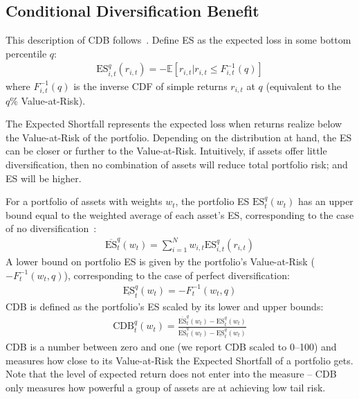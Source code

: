 
\subsection{Conditional Diversification Benefit} %
\label{sub:conditional_diversification_benefit}

This description of CDB follows~\textcite{ChristoffersenErrunzaJacobLanglois2012}. Define ES as the expected loss in some bottom percentile $q$:
\begin{align}
    \text{ES}_{i,t}^q(r_{i,t}) = -\mathbb{E}[r_{i,t} | r_{i,t} \leq F_{i,t}^{-1}(q)]
\end{align}
where $F_{i,t}^{-1}(q)$ is the inverse CDF of simple returns $r_{i,t}$ at $q$ (equivalent to the $q\%$ Value-at-Risk). 

The Expected Shortfall represents the expected loss when returns realize below the Value-at-Risk of the portfolio. Depending on the distribution at hand, the ES can be closer or further to the Value-at-Risk. Intuitively, if assets offer little diversification, then no combination of assets will reduce total portfolio risk; and ES will be higher. 

For a portfolio of assets with weights $w_t$, the portfolio ES $\text{ES}_t^q(w_t)$ has an upper bound equal to the weighted average of each asset's ES, corresponding to the case of no diversification~\autocite{Artzner1999}:
\begin{align}
  \overline{\text{ES}}_t^q(w_t) = \sum_{i=1}^N w_{i,t} \text{ES}_{i,t}^q(r_{i,t})
\end{align}
A lower bound on portfolio ES is given by the portfolio's Value-at-Risk ($-F_{t}^{-1}(w_t, q)$), corresponding to the case of perfect diversification:
\begin{align}
  \underline{\text{ES}}_t^q(w_t) = -F_{t}^{-1}(w_t, q)
\end{align}
CDB is defined as the portfolio's ES scaled by its lower and upper bounds:
\begin{align}
  \text{CDB}_t^q(w_t) = \frac{\overline{\text{ES}}_t^q(w_t) - \text{ES}_t^q(w_t)}{\overline{\text{ES}}_t^q(w_t) - \underline{\text{ES}}_t^q(w_t)}
\end{align}
CDB is a number between zero and one (we report CDB scaled to 0--100) and measures how close to its Value-at-Risk the Expected Shortfall of a portfolio gets. Note that the level of expected return does not enter into the measure -- CDB only measures how powerful a group of assets are at achieving low tail risk.

